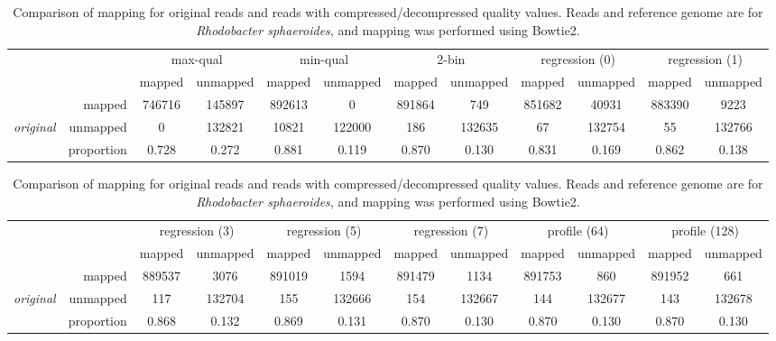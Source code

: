 \documentclass{bioinfo}
\begin{document}
\begin{table}[!tbhp]
\centering
\caption[]{Comparison of mapping for original reads and reads with
  compressed/decompressed quality values. Reads and reference genome
  are for \textit{Rhodobacter sphaeroides}, and mapping was performed
  using Bowtie2.}
\begin{small}
\begin{tabular}{lr|cc|cc|cc|cc|cc}
 & & \multicolumn{2}{c|}{max-qual} & \multicolumn{2}{c|}{min-qual} & \multicolumn{2}{c|}{2-bin} & \multicolumn{2}{c|}{regression (0)} & \multicolumn{2}{c}{regression (1)} \\
& & mapped & unmapped & mapped & unmapped & mapped & unmapped & mapped & unmapped & mapped & unmapped \\ 
\cline{2-12}
& mapped & 746716 & 145897 & 892613 &   0 & 891864 & 749 & 851682 & 40931 & 883390 & 9223 \\ 
{\em original} & unmapped &   0 & 132821 & 10821 & 122000 & 186 & 132635 &  67 & 132754 &  55 & 132766 \\ 
\cline{2-12}
& proportion & 0.728 & 0.272 & 0.881 & 0.119 & 0.870 & 0.130 & 0.831 & 0.169 & 0.862 & 0.138 \\ 
\end{tabular}

\bigskip

\begin{tabular}{lr|cc|cc|cc|cc|cc}
 & & \multicolumn{2}{c|}{regression (3)} & \multicolumn{2}{c|}{regression (5)} & \multicolumn{2}{c|}{regression (7)} & \multicolumn{2}{c|}{profile (64)} & \multicolumn{2}{c}{profile (128)} \\
& & mapped & unmapped & mapped & unmapped & mapped & unmapped & mapped & unmapped & mapped & unmapped \\ 
\cline{2-12}
& mapped & 889537 & 3076 & 891019 & 1594 & 891479 & 1134 & 891753 & 860 & 891952 & 661 \\ 
{\em original} & unmapped & 117 & 132704 & 155 & 132666 & 154 & 132667 & 144 & 132677 & 143 & 132678 \\ 
\cline{2-12}
& proportion & 0.868 & 0.132 & 0.869 & 0.131 & 0.870 & 0.130 & 0.870 & 0.130 & 0.870 & 0.130 \\ 
\end{tabular}

\bigskip


\end{small}
\end{table}
\end{document}
